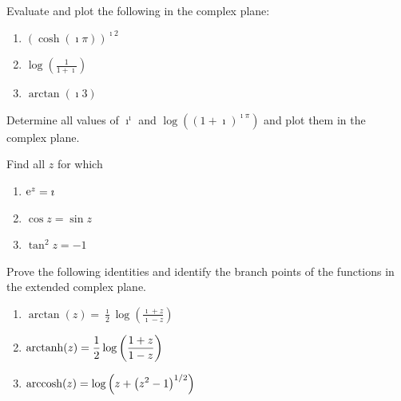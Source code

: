 {\begin{Exercise}
\end{Exercise}





\begin{Exercise}
  \label{exercise cosh ip i2}
Evaluate and plot the following in the complex plane:
\begin{enumerate}
\item 
  $\displaystyle
  ( \cosh(\imath \pi) )^{\imath 2}
  $
\item 
  $\displaystyle
  \log \left( \frac{1}{1 + \imath} \right)
  $
\item 
  $\displaystyle
  \arctan(\imath 3)
  $
\end{enumerate}

\end{Exercise}





\begin{Exercise}
  \label{exercise ii log1i}
  Determine all values of $\imath^\imath$ and $\log\left( (1+\imath)^{\imath \pi} \right)$ and 
  plot them in the complex plane.

\end{Exercise}







\begin{Exercise}
  Find all $z$ for which
  \begin{enumerate}
  \item
    $\mathop{\mathrm{e}}\nolimits^z = \imath$ 
  \item
    $\cos z = \sin z$ 
  \item
    $\tan^2 z = -1$
  \end{enumerate}

\end{Exercise}






\begin{Exercise}
  \label{exercise arctan z}
  Prove the following identities
  and identify the branch points of the functions in the extended 
  complex plane.
  \begin{enumerate}
  \item
    $\displaystyle
    \arctan(z) =\frac{\imath}{2} \log\left( \frac{\imath + z}{\imath - z}\right)
    $
  \item
    $\displaystyle
    \mathop{\mathrm{arctanh}}\nolimits(z) =\frac{1}{2} \log\left( \frac{1 + z}{1 - z}\right)
    $
  \item
    $\displaystyle
    \mathop{\mathrm{arccosh}}\nolimits(z) = \log \left( z + \left( z^2 - 1 \right)^{1/2} \right)
    $
  \end{enumerate}


\end{Exercise}}
